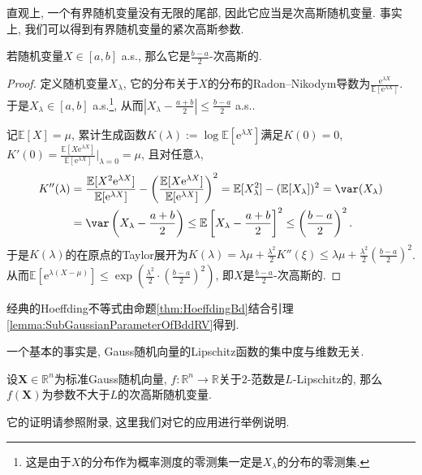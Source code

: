 直观上, 一个有界随机变量没有无限的尾部, 因此它应当是次高斯随机变量. 
事实上, 我们可以得到有界随机变量的紧次高斯参数. 
\begin{lemma}[有界随机变量]\label{lemma:SubGaussianParameterOfBddRV}
	若随机变量$X \in [a, b]$ a.s., 那么它是$\frac{b-a}{2}$-次高斯的. 
\end{lemma}
\begin{proof}
	定义随机变量$X_{\lambda}$, 它的分布关于$X$的分布的Radon–Nikodym导数为$\frac{\mathrm{e}^{\lambda X}}{\mathbb{E}[\mathrm{e}^{\lambda X}]}$. 
	于是$X_{\lambda} \in [a, b]$ a.s.\footnote{这是由于$X$的分布作为概率测度的零测集一定是$X_{\lambda}$的分布的零测集.}, 从而$\left|X_{\lambda} - \frac{a+b}{2} \right| \leq \frac{b-a}{2}$ a.s..
	
	记$\mathbb{E}[X] = \mu$, 累计生成函数$K(\lambda) := \log \mathbb{E}[\mathrm{e}^{\lambda X}]$满足$K(0) = 0$, $K'(0) = \frac{\mathbb{E}[X \mathrm{e}^{\lambda X}]}{\mathbb{E}[\mathrm{e}^{\lambda X}]} \big|_{\lambda = 0} = \mu$, 且对任意$\lambda$, 
	\begin{align*}
		K''(\lambda) 
		&= \frac{\mathbb{E}[X^2 \mathrm{e}^{\lambda X}]}{\mathbb{E}[\mathrm{e}^{\lambda X}]} - \left( \frac{\mathbb{E}[X \mathrm{e}^{\lambda X}]}{\mathbb{E}[\mathrm{e}^{\lambda X}]} \right)^2
		= \mathbb{E}[X_{\lambda}^2] - (\mathbb{E}[X_{\lambda}])^2
		= \var (X_{\lambda})\\
		&= \var \left(X_{\lambda} - \frac{a+b}{2} \right) 
		\leq \mathbb{E}\left[X_{\lambda} - \frac{a+b}{2} \right]^2 
		\leq \left(\frac{b-a}{2}\right)^2.  
	\end{align*} 
	于是$K(\lambda)$的在原点的Taylor展开为$K(\lambda) = \lambda \mu + \frac{\lambda^2}{2} K''(\xi) \leq \lambda \mu + \frac{\lambda^2}{2} \left(\frac{b-a}{2}\right)^2$. 
	从而$\mathbb{E}[\mathrm{e}^{\lambda(X - \mu)}] \leq \exp\left(\frac{\lambda^2}{2} \cdot \left(\frac{b-a}{2}\right)^2\right)$, 即$X$是$\frac{b-a}{2}$-次高斯的. 
\end{proof}

\begin{corollary}
	经典的Hoeffding不等式由命题\ref{thm:HoeffdingBd}结合引理\ref{lemma:SubGaussianParameterOfBddRV}得到. 
\end{corollary}

一个基本的事实是, Gauss随机向量的Lipschitz函数的集中度与维数无关. 
\begin{theorem}\label{thm:LipOfGaussianIsDimFree}
	设$\bm{X} \in \mathbb{R}^n$为标准Gauss随机向量, $f \colon \mathbb{R}^n \to \mathbb{R}$关于$2$-范数是$L$-Lipschitz的, 那么$f(\bm{X})$为参数不大于$L$的次高斯随机变量. 
\end{theorem}
它的证明请参照附录, 这里我们对它的应用进行举例说明. 

